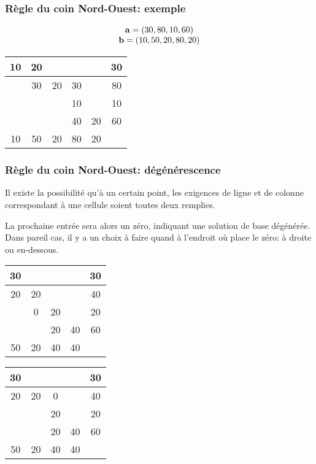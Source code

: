 \documentclass[usepdftitle=false, aspectratio=169]{beamer}
\begin{document}
\begin{frame}
\frametitle{Règle du coin Nord-Ouest: exemple}

\[
\begin{matrix}
{\bf a} = (30, 80, 10, 60) \\
{\bf b} = (10, 50, 20, 80, 20) \\
\end{matrix}
\]

\begin{center}
\begin{tabular}{|c|c|c|c|c|c}
\hline
10 & 20 & & & & 30 \\
\hline
& 30 & 20 & 30 & & 80 \\
\hline
& & & 10 & & 10 \\
\hline
& & & 40 & 20 & 60 \\
\hline
10 & 50 & 20 & 80 & 20 & \\
\end{tabular}
\end{center}

\end{frame}

\begin{frame}
\frametitle{Règle du coin Nord-Ouest: dégénérescence}

Il existe la possibilité qu'à un certain point, les exigences de ligne et de colonne correspondant à une cellule soient toutes deux remplies.

\mbox{}

La prochaine entrée sera alors un zéro, indiquant une solution de base dégénérée. Dans pareil cas, il y a un choix à faire quand à l'endroit où place le zéro: à droite ou en-dessous.

\mbox{}

\begin{center}
\begin{minipage}{.4\linewidth}
\begin{tabular}{|c|c|c|c|c}
\hline
30 & & & & 30 \\
\hline
20 & 20 & & & 40 \\
\hline
& 0 & 20 & & 20 \\
\hline
& & 20 & 40 & 60 \\
\hline
50 & 20 & 40 & 40 & \\
\end{tabular}
\end{minipage}
\begin{minipage}{.4\linewidth}
\begin{tabular}{|c|c|c|c|c}
\hline
30 & & & & 30 \\
\hline
20 & 20 & 0 & & 40 \\
\hline
& & 20 & & 20 \\
\hline
& & 20 & 40 & 60 \\
\hline
50 & 20 & 40 & 40 & \\
\end{tabular}
\end{minipage}
\end{center}

\end{frame}
\end{document}

